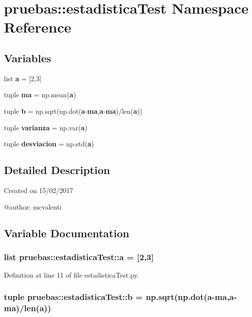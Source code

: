 \section{pruebas\-:\-:estadistica\-Test \-Namespace \-Reference}
\label{namespacepruebas_1_1estadistica_test}
\subsection*{\-Variables}
\begin{DoxyCompactItemize}
\item 
list {\bf a} = [2,3]
\item 
tuple {\bf ma} = np.\-mean({\bf a})
\item 
tuple {\bf b} = np.\-sqrt(np.\-dot({\bf a}-\/{\bf ma},{\bf a}-\/{\bf ma})/len({\bf a}))
\item 
tuple {\bf varianza} = np.\-var({\bf a})
\item 
tuple {\bf desviacion} = np.\-std({\bf a})
\end{DoxyCompactItemize}


\subsection{\-Detailed \-Description}
\begin{DoxyVerb}
Created on 15/02/2017

@author: mcvalenti
\end{DoxyVerb}
 

\subsection{\-Variable \-Documentation}
\subsubsection[{a}]{\setlength{\rightskip}{0pt plus 5cm}list {\bf pruebas\-::estadistica\-Test\-::a} = [2,3]}\label{namespacepruebas_1_1estadistica_test_acfcd6f1902c8a6c767c9cf98cb808ed8}


\-Definition at line 11 of file estadistica\-Test.\-py.

\subsubsection[{b}]{\setlength{\rightskip}{0pt plus 5cm}tuple {\bf pruebas\-::estadistica\-Test\-::b} = np.\-sqrt(np.\-dot({\bf a}-\/{\bf ma},{\bf a}-\/{\bf ma})/len({\bf a}))}\label{namespacepruebas_1_1estadistica_test_a3645453ab1e07f7851aff6e547957366}


